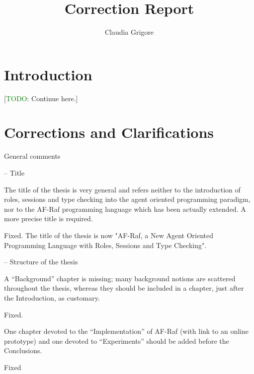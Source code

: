 \documentclass{article}
\title{Correction Report}
\author{Claudia Grigore}
\newcommand{\todo}[1]{[\textcolor{green}{TODO}: #1]}
\newenvironment{them}{\noindent\begingroup\color{blue}}{\endgroup\par}
\begin{document}
\maketitle

\section{Introduction}

\todo{Continue here.}
\section{Corrections and Clarifications}

\begin{them}
General comments
\end{them}


\begin{them}
-- Title

The title of the thesis is very general and refers neither to the introduction
of roles, sessions and type checking into the agent oriented programming
paradigm, nor to the AF-Raf programming language which has been actually
extended. A more precise title is required.

\end{them}
Fixed. The title of the thesis is now "AF-Raf, a New Agent Oriented Programming
Language with Roles, Sessions and Type Checking".

\begin{them}

-- Structure of the thesis

A “Background” chapter is missing; many background notions are scattered
throughout the thesis, whereas they should be included in a chapter, just after
the Introduction, as customary.

\end{them}
Fixed.

\begin{them}

One chapter devoted to the “Implementation” of AF-Raf (with link to an online
prototype) and one devoted to “Experiments” should be added before the
Conclusions.

\end{them}
Fixed
\end{document}
